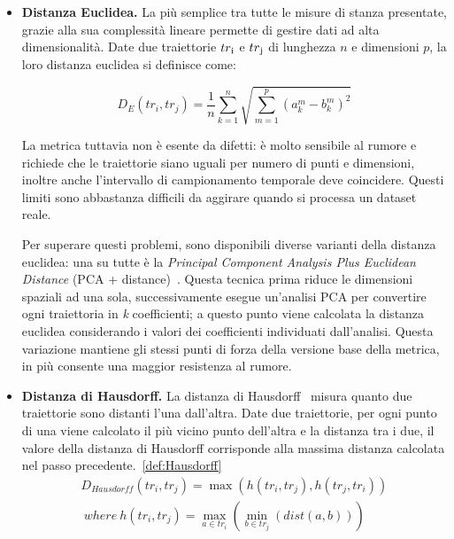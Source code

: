 \begin{itemize}

  \item \textbf{Distanza Euclidea.}
  La più semplice tra tutte le misure di stanza presentate, grazie alla sua complessità lineare permette di gestire dati ad alta dimensionalità.
  Date due traiettorie  \(tr\textsubscript{i}\) e  \(tr\textsubscript{j}\) di lunghezza \(n\) e dimensioni \(p\), la loro distanza euclidea si definisce come:

  \begin{equation}
    {D_E(tr_{i}, tr_{j}) = { {\frac{1}{n} } \sum_{k=1}^{n} {\sqrt{\sum_{m=1}^{p}{(a_{k}^{m} - b_{k}^{m})}^2}}}}
  \end{equation}

  La metrica tuttavia non è esente da difetti: è molto sensibile al rumore e richiede che le traiettorie siano uguali per numero di punti
  e dimensioni, inoltre anche l'intervallo di campionamento temporale deve coincidere.
  Questi limiti sono abbastanza difficili da aggirare quando si processa un dataset reale.

  Per superare questi problemi, sono disponibili diverse varianti della distanza euclidea: una su tutte è la \textit{Principal Component Analysis Plus Euclidean Distance} (PCA + distance)~\cite{zhang2006comparison}.
  Questa tecnica prima riduce le dimensioni spaziali ad una sola, successivamente esegue un'analisi PCA per convertire ogni traiettoria in
  \textit{k} coefficienti; a questo punto viene calcolata la distanza euclidea considerando i valori dei coefficienti individuati dall'analisi.
  Questa variazione mantiene gli stessi punti di forza della versione base della metrica, in più consente una maggior resistenza al rumore.


  \item \textbf{Distanza di Hausdorff.}
  La distanza di Hausdorff~\cite{chen2011clustering} misura quanto due traiettorie sono distanti l'una dall'altra.
  Date due traiettorie, per ogni punto di una viene calcolato il più vicino punto dell'altra e la distanza tra i due, il valore della distanza di Hausdorff
  corrisponde alla massima distanza calcolata nel passo precedente.~\cref{def:Hausdorff}
  \begin{equation} \label{def:Hausdorff}
    \begin{multlined}
      {D_{Hausdorff}(tr_{i}, tr_{j}) = \max{(h(tr_{i}, tr_{j}), h(tr_{j}, tr_{i}))}} \\
      ~where~{h(tr_{i}, tr_{j}) = \max_{a \in tr_{i}}{(\min_{b \in tr_{j}}{(dist(a,b))})}}
    \end{multlined}
  \end{equation}


\end{itemize}
